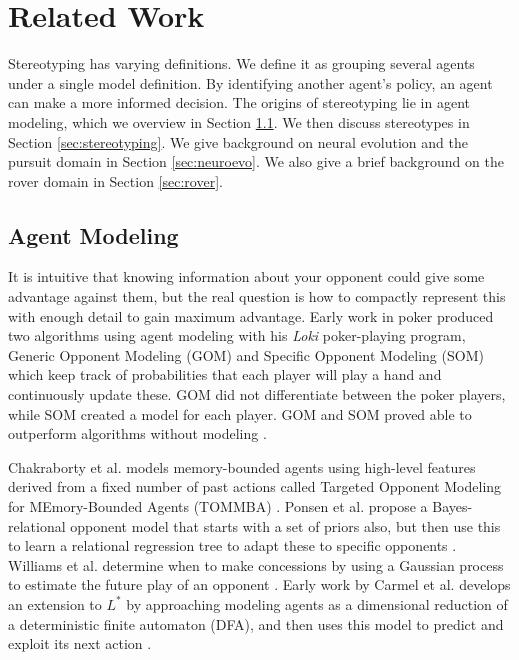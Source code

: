 \documentclass{aamas2014}
\begin{document}
\section{Related Work}
\label{sec:relatedwork}

Stereotyping has varying definitions. We define it as grouping several agents under a single model definition. By identifying another agent's policy, an agent can make a more informed decision. The  origins of stereotyping lie in agent modeling, which we overview in Section \ref{sec:agentmodeling}. We then discuss stereotypes in Section \ref{sec:stereotyping}. We give background on neural evolution and the pursuit domain in Section \ref{sec:neuroevo}. We also give a brief background on the rover domain in Section \ref{sec:rover}.

\subsection{Agent Modeling}
\label{sec:agentmodeling}

It is intuitive that knowing information about your opponent could give some advantage against them, but the real question is how to compactly represent this with enough detail to gain maximum advantage. Early work in poker produced two algorithms using agent modeling with his \emph{Loki} poker-playing program, Generic Opponent Modeling (GOM) and Specific Opponent Modeling (SOM) which keep track of probabilities that each player will play a hand and continuously update these. GOM did not differentiate between the poker players, while SOM created a model for each player. GOM and SOM proved able to outperform algorithms without modeling \cite{Loki}.

Chakraborty et al. models memory-bounded agents using high-level features derived from a fixed number of past actions called Targeted Opponent Modeling for MEmory-Bounded Agents (TOMMBA) \cite{TOMMBA}. Ponsen et al. propose a Bayes-relational opponent model that starts with a set of priors also, but then use this to learn a relational regression tree to adapt these to specific opponents \cite{Ponsen}. Williams et al. determine when to make concessions by using a Gaussian process to estimate the future play of an opponent \cite{Williams}. Early work by Carmel et al. develops an extension to $L^*$ by approaching modeling agents as a dimensional reduction of a deterministic finite automaton (DFA), and then uses this model to predict and exploit its next action \cite{Carmel}.
\end{document}
